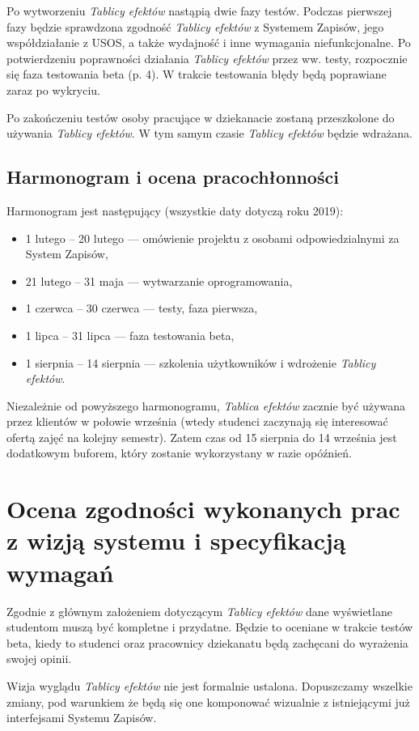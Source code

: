 \documentclass{article}
\begin{document}
Po wytworzeniu \textit{Tablicy efektów} nastąpią dwie fazy testów.
Podczas pierwszej fazy będzie sprawdzona zgodność \textit{Tablicy efektów} z Systemem Zapisów, jego współdziałanie z USOS, a także wydajność i inne wymagania niefunkcjonalne.
Po potwierdzeniu poprawności działania \textit{Tablicy efektów} przez ww. testy, rozpocznie się faza testowania beta (p. 4).
W trakcie testowania błędy będą poprawiane zaraz po wykryciu.

Po zakończeniu testów osoby pracujące w dziekanacie zostaną przeszkolone do używania \textit{Tablicy efektów}.
W tym samym czasie \textit{Tablicy efektów} będzie wdrażana.

\subsection{Harmonogram i ocena pracochłonności}
Harmonogram jest następujący (wszystkie daty dotyczą roku 2019):
\begin{samepage}
\begin{itemize}
 \item 1 lutego -- 20 lutego --- omówienie projektu z osobami odpowiedzialnymi za System Zapisów,
 \item 21 lutego -- 31 maja --- wytwarzanie oprogramowania,
 \item 1 czerwca -- 30 czerwca --- testy, faza pierwsza,
 \item 1 lipca -- 31 lipca --- faza testowania beta,
 \item 1 sierpnia -- 14 sierpnia --- szkolenia użytkowników i wdrożenie \textit{Tablicy efektów}.
\end{itemize}
\end{samepage}
Niezależnie od powyższego harmonogramu, \textit{Tablica efektów} zacznie być używana przez klientów w połowie września (wtedy studenci zaczynają się interesować ofertą zajęć na kolejny semestr).
Zatem czas od 15 sierpnia do 14 września jest dodatkowym buforem, który zostanie wykorzystany w razie opóźnień.

\section{Ocena zgodności wykonanych prac z wizją systemu i specyfikacją wymagań}
Zgodnie z głównym założeniem dotyczącym \textit{Tablicy efektów} dane wyświetlane studentom muszą być kompletne i przydatne.
Będzie to oceniane w trakcie testów beta, kiedy to studenci oraz pracownicy dziekanatu będą zachęcani do wyrażenia swojej opinii.

Wizja wyglądu \textit{Tablicy efektów} nie jest formalnie ustalona.
Dopuszczamy wszelkie zmiany, pod warunkiem że będą się one komponować wizualnie z istniejącymi już interfejsami Systemu Zapisów.
\end{document}
